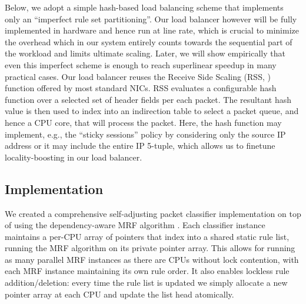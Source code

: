 Below, we adopt a simple hash-based load balancing scheme that implements only an ``imperfect rule set partitioning''. Our load balancer however will be fully implemented in hardware and hence run at line rate, which is crucial to minimize the overhead which in our system entirely counts towards the sequential part of the workload and limits ultimate scaling.  Later, we will show empirically that even this imperfect scheme is enough to reach superlinear speedup in many practical cases. Our load balancer reuses the Receive Side Scaling (RSS, \cite{10.1145/3359989.3365412, rss-linux}) function offered by most standard NICs. RSS evaluates a configurable hash function over a selected set of header fields per each packet. The resultant hash value is then used to index into an indirection table to select a packet queue, and hence a CPU core, that will process the packet. Here, the hash function may implement, e.g., the ``sticky sessions'' policy by considering only the source IP address or it may include the entire IP 5-tuple, which allows us to finetune locality-boosting in our load balancer.

\subsection{Implementation}
\label{sec:sa-nf-tables-impl}

We created a comprehensive self-adjusting packet classifier implementation on top of \nftables using the dependency-aware MRF algorithm \cite{10228937}. Each classifier instance maintains a per-CPU array of pointers that index into a shared static rule list, running the MRF algorithm on its private pointer array. This allows for running as many parallel MRF instances as there are CPUs without lock contention, with each MRF instance maintaining its own rule order. It also enables lockless rule addition\slash deletion: every time the rule list is updated we simply allocate a new pointer array at each CPU and update the list head atomically.

